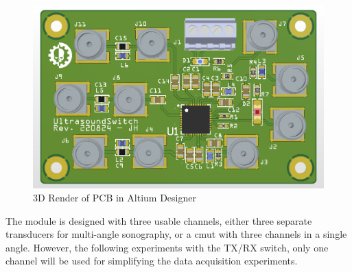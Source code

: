 \begin{figure}[htbp]
	\centering
	\includegraphics[width=.8\textwidth]{Figures/3_ultrasoundswitch.png}
	\caption{3D Render of PCB in Altium Designer}
	\label{fig:3_ultrasoundswitch}
\end{figure}
The module is designed with three usable channels, either three separate transducers for multi-angle sonography, or a \gls{cmut} with three channels in a single angle. However, the following experiments with the TX/RX switch, only one channel will be used for simplifying the data acquisition experiments.


